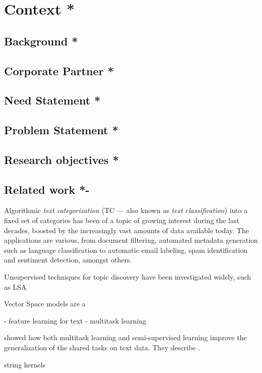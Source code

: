 
\clearpage
\section{Context *}

\subsection{Background *}

\subsection{Corporate Partner *}

\subsection{Need Statement *}

\subsection{Problem Statement *}

\subsection{Research objectives *}

\subsection{Related work *-}


Algorithmic \emph{text categorization} (TC --- also known as \emph{text classification}) into a fixed set of categories has been of a topic of growing interest during the last decades, boosted by the increasingly vast amounts of data available today. The applications are various, from document filtering, automated metadata generation such as language classification to automatic email labeling, spam identification and sentiment detection, amongst others.

Unsupervised techniques for topic discovery have been investigated widely, such as LSA

Vector Space models are a

- feature learning for text
- multitask learning


\cite{Collobert:2008aa} showed how both multitask learning and semi-supervised learning improve the generalization of the shared tasks on text data. They describe .

\cite{Lodhi:2002aa} string kernels

